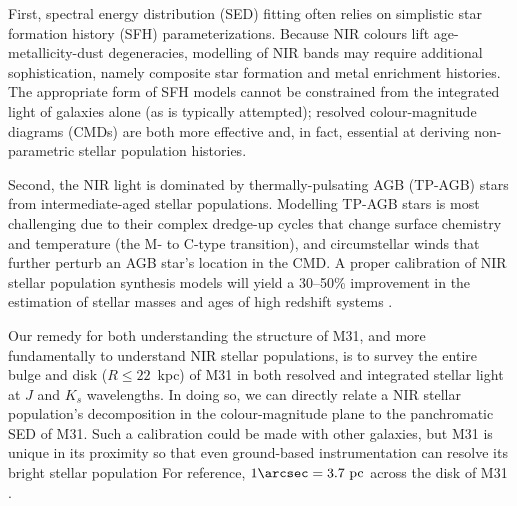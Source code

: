 \documentclass[iop]{emulateapj}
\newcommand{\eg}{\textit{e.g.,~}}
\begin{document}
First, spectral energy distribution (SED) fitting often relies on simplistic star formation history (SFH) parameterizations.
Because NIR colours lift age-metallicity-dust degeneracies, modelling of NIR bands may require additional sophistication, namely composite star formation and metal enrichment histories.
The appropriate form of SFH models cannot be constrained from the integrated light of galaxies alone (as is typically attempted); resolved colour-magnitude diagrams (CMDs) are both more effective and, in fact, essential at deriving non-parametric stellar population histories. 

Second, the NIR light is dominated by thermally-pulsating AGB (TP-AGB) stars from intermediate-aged stellar populations.
Modelling TP-AGB stars is most challenging due to their complex dredge-up cycles that change surface chemistry and temperature (the M- to C-type transition), and circumstellar winds that further perturb an AGB star's location in the CMD.
A proper calibration of NIR stellar population synthesis models \cite[\eg][Charlot \& Bruzual in prep.]{Maraston:2005} will yield a 30--50\% improvement in the estimation of stellar masses and ages of high redshift systems \citep[\eg][]{Maraston:2006,Bruzual:2007,Conroy:2010b,Conroy:2013}.

Our remedy for both understanding the structure of M31, and more fundamentally to understand NIR stellar populations, is to survey the entire bulge and disk ($R \leq 22$~kpc) of M31 in both resolved and integrated stellar light at $J$ and $K_s$ wavelengths.
In doing so, we can directly relate a NIR stellar population's decomposition in the colour-magnitude plane to the panchromatic SED of M31.
Such a calibration could be made with other galaxies, but M31 is unique in its proximity so that even ground-based instrumentation can resolve its bright stellar population
For reference, $1\arcsec = 3.7~\mathrm{pc}$ across the disk of M31 \citep[we adopt $D_\mathrm{M31} = 785$~kpc,][]{McConnachie:2005}.
\end{document}
